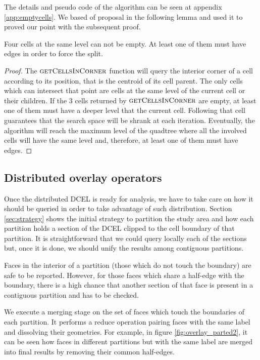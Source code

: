 The details and pseudo code of the algorithm can be seen at appendix \ref{app:emptycells}.  We based of proposal in the following lemma and used it to proved our point with the subsequent proof.

\begin{lemma}
Four cells at the same level can not be empty.  At least one of them must have edges in order to force the split.
\end{lemma}

\begin{proof}
The $\textsc{getCellsInCorner}$ function will query the interior corner of a cell according to its position, that is the centroid of its cell parent.  The only cells which can intersect that point are cells at the same level of the current cell or their children.  If the 3 cells returned by $\textsc{getCellsInCorner}$ are empty, at least one of them must have a deeper level that the current cell.  Following that cell guarantees that the search space will be shrank at each iteration.  Eventually, the algorithm will reach the maximum level of the quadtree where all the involved cells will have the same level and, therefore, at least one of them must have edges.
\end{proof}

\subsection{Distributed overlay operators} \label{sec:overlay}
Once the distributed DCEL is ready for analysis, we have to take care on how it should be queried in order to take advantage of such distribution.  Section \ref{sec:strategy} shows the initial strategy to partition the study area and how each partition holds a section of the DCEL clipped to the cell boundary of that partition.  It is straightforward that we could query locally each of the sections but, once it is done, we should unify the results among contiguous partitions.

Faces in the interior of a partition (those which do not touch the boundary) are safe to be reported.  However, for those faces which share a half-edge with the boundary, there is a high chance that another section of that face is present in a contiguous partition and has to be checked.  

We execute a merging stage on the set of faces which touch the boundaries of each partition.  It performs a reduce operation pairing faces with the same label and dissolving their geometries.  For example, in figure \ref{fig:overlay_parted2}, it can be seen how faces in different partitions but with the same label are merged into final results by removing their common half-edges. 

